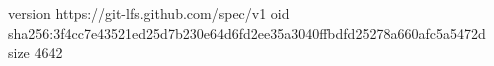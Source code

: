 version https://git-lfs.github.com/spec/v1
oid sha256:3f4cc7e43521ed25d7b230e64d6fd2ee35a3040ffbdfd25278a660afc5a5472d
size 4642
